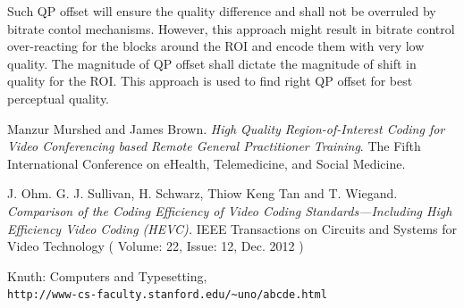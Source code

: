 \documentclass[11pt]{article} %
\begin{document}
Such QP offset will ensure the quality difference and shall not be overruled by bitrate contol mechanisms. However, this approach might result in bitrate control over-reacting for the blocks around the ROI and encode them with very low quality. The magnitude of QP offset shall dictate the magnitude of shift in quality for the ROI. This approach is used to find right QP offset for best perceptual quality.
%
%
%
%
%
\clearpage
\begin{thebibliography}{9}
Manzur Murshed and James Brown. 
\textit{High Quality Region-of-Interest Coding for Video Conferencing based Remote General Practitioner Training}. 
The Fifth International Conference on eHealth, Telemedicine, and Social Medicine.
 
J. Ohm. G. J. Sullivan, H. Schwarz, Thiow Keng Tan and T. Wiegand.
\textit{Comparison of the Coding Efficiency of Video Coding Standards—Including High Efficiency Video Coding (HEVC).}
 IEEE Transactions on Circuits and Systems for Video Technology ( Volume: 22, Issue: 12, Dec. 2012 )
 
Knuth: Computers and Typesetting,
\\\texttt{http://www-cs-faculty.stanford.edu/\~{}uno/abcde.html}
\end{thebibliography}
\end{document}
